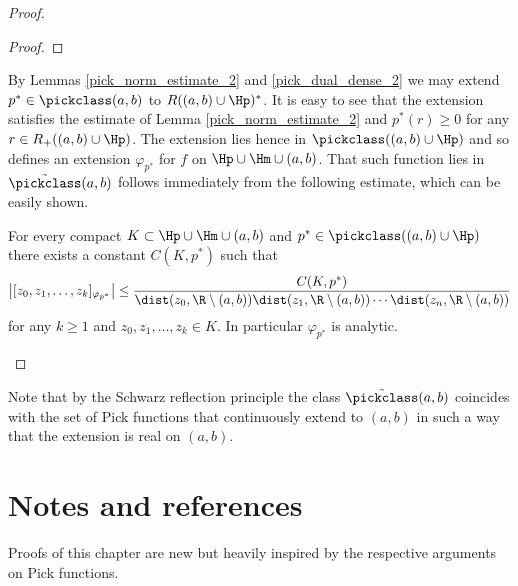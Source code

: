 \begin{proof}
\begin{proof}
	\end{proof}
	By Lemmas \ref{pick_norm_estimate_2} and \ref{pick_dual_dense_2} we may extend $p^{*} \in \pickclass(a, b)$ to $R((a, b) \cup \Hp)^{*}$. It is easy to see that the extension satisfies the estimate of Lemma \ref{pick_norm_estimate_2} and $p^{*}(r) \geq 0$ for any $r \in R_{+}((a, b) \cup \Hp)$. The extension lies hence in $\pickclass((a, b) \cup \Hp)$ and so defines an extension $\varphi_{p^{*}}$ for $f$ on $\Hp \cup \Hm \cup (a, b)$. That such function lies in $\tilde{\pickclass}(a, b)$ follows immediately from the following estimate, which can be easily shown.
	\begin{lem}\label{pick_div_dif_estimate_2}
		For every compact $K \subset \Hp \cup \Hm \cup (a, b)$ and $p^{*} \in \pickclass((a, b) \cup \Hp)$ there exists a constant $C(K, p^{*})$ such that
		\begin{align*}
			\left|[z_{0}, z_{1}, \ldots, z_{k}]_{\varphi_{p^{*}}}\right| \leq \frac{C(K, p^{*})}{\dist(z_{0}, \R \setminus (a, b)) \dist(z_{1}, \R \setminus (a, b)) \cdots \dist(z_{n}, \R \setminus (a, b))}
		\end{align*}
		for any $k \geq 1$ and $z_{0}, z_{1}, \ldots, z_{k} \in K$. In particular $\varphi_{p^{*}}$ is analytic.
	\end{lem}
\end{proof}

Note that by the Schwarz reflection principle the class $\tilde{\pickclass}(a, b)$ coincides with the set of Pick functions that continuously extend to $(a, b)$ in such a way that the extension is real on $(a, b)$.

\section{Notes and references}

Proofs of this chapter are new but heavily inspired by the respective arguments on Pick functions.

